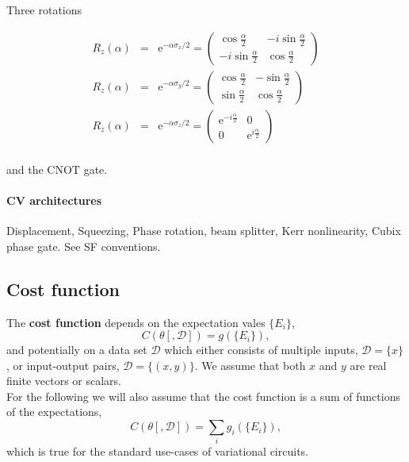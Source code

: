\documentclass[amsmath,amssymb,aps,pra,10pt,twocolumn,groupedaddress,nofootinbib]{revtex4-1}
\newcommand{\e}{\mathrm{e}}
\begin{document}
Three rotations 

\begin{eqnarray*}
	R_z(\alpha) &=& \e^{-\alpha \sigma_x /2} = 
	\begin{pmatrix} 
	\cos \frac{\alpha}{2} & -i \sin \frac{\alpha}{2}\\
	-i \sin \frac{\alpha}{2} & \cos \frac{\alpha}{2}
	\end{pmatrix}\\
	R_z(\alpha) &=& \e^{-\alpha \sigma_y /2} = 	
	\begin{pmatrix} 
	\cos \frac{\alpha}{2} & -\sin \frac{\alpha}{2}\\
    \sin \frac{\alpha}{2} & \cos \frac{\alpha}{2}
	\end{pmatrix}\\
	R_z(\alpha) &=& \e^{-\alpha \sigma_z /2}=
	\begin{pmatrix} 
	\e^{-i \frac{\alpha}{2}} & 0\\
	0 & \e^{i \frac{\alpha}{2}}
	\end{pmatrix}\\ 
\end{eqnarray*}

and the $\mathrm{CNOT}$ gate.

\paragraph{CV architectures}

Displacement, Squeezing, Phase rotation, beam splitter, Kerr nonlinearity, Cubix phase gate. See SF conventions.

\subsection{Cost function}

The \textbf{cost function} depends on the expectation vales $\{E_i\}$,
\[C(\theta[, \mathcal{D}]) = g(\{E_i\}),\]
and potentially on a data set $\mathcal{D}$ which either consists of multiple inputs, $\mathcal{D} = \{x\}$, or input-output pairs, $\mathcal{D} = \{(x ,y)\}$. We assume that both $x$ and $y$ are real finite vectors or scalars.\\

For the following we will also assume that the cost function is a sum of functions of the expectations,
\begin{equation}
	C(\theta[, \mathcal{D}]) = \sum_i g_i(\{E_i\}),
	\label{eq:cost}
\end{equation}
which is true for the standard use-cases of variational circuits.
\end{document}

